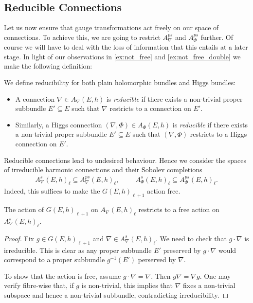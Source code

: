 \documentclass[12pt]{ociamthesis}  %
\begin{document}
\subsection{Reducible Connections}

Let us now ensure that gauge transformations act freely on
our space of connections. To achieve this, we are going to 
restrict $A^{ps}_\nabla$ and $A^{ps}_\Phi$ further. Of course
we will have to deal with the loss of information that this entails
at a later stage.
In light of our observations in \ref{ex:not_free} and \ref{ex:not_free_double}
we make the following definition:

\begin{definition}
  We define reducibility for both plain holomorphic bundles and Higgs
  bundles:
  \begin{itemize}
    \item A connection $\nabla\in A_\nabla (E,h)$ is \emph{reducible} if there exists
          a non-trivial proper subbundle $E'\subseteq E$ such that $\nabla$ restricts
          to a connection on $E'$.
    \item Similarly, a Higgs connection $(\nabla,\Phi)\in A_\Phi(E,h)$ is
          \emph{reducible} if there exists a non-trivial proper subbundle $E'\subseteq E$
          such that $(\nabla,\Phi)$ restricts to a Higgs connection on $E'$.
  \end{itemize}
\end{definition}

Reducible connections lead to undesired behaviour. Hence we
consider the spaces of irreducible harmonic connections and their Sobolev
completions
\begin{align*}
  A^s_\nabla(E,h)_\ell \subseteq A^{ps}_\nabla(E,h)_\ell,\hspace{1cm}
  A^s_\Phi(E,h)_\ell \subseteq A^{ps}_\Phi(E,h)_\ell.
\end{align*}
Indeed, this suffices to make the $G(E,h)_{\ell+1}$ action free.

\begin{lemma}\label{lem:free_action}
  The action of $G(E,h)_{\ell+1}$ on $A_\nabla(E,h)_\ell$
  restricts to a free action on $A^s_\nabla(E,h)_\ell$.
  \begin{proof}
    Fix $g\in G(E,h)_{\ell+1}$ and $\nabla\in A^s_\nabla(E,h)_\ell$.
    We need to check that $g\cdot\nabla$ is irreducible. This is clear
    as any proper subbundle $E'$ preserved by $g\cdot\nabla$ would correspond
    to a proper subbundle $g^{-1}(E')$ perserved by $\nabla$.

    To show that the action is free, assume $g\cdot\nabla = \nabla$.
    Then $g\nabla = \nabla g$. One may verify fibre-wise that, if $g$
    is non-trivial, this implies that $\nabla$ fixes a non-trivial
    subspace and hence a non-trivial subbundle, contradicting irreducibility.
  \end{proof}
\end{lemma}
\end{document}
